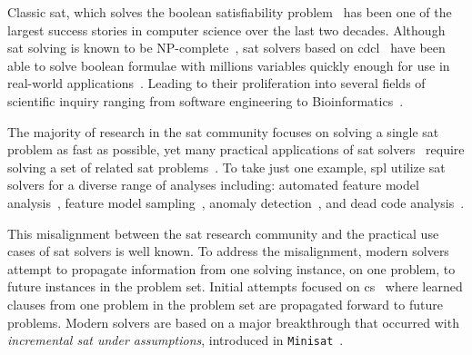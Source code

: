 \label{section:motivation}
%
%
Classic \ac{sat}, which solves the boolean satisfiability problem~\cite{BBH+09}
has been one of the largest success stories in computer science over the last
two decades. Although \ac{sat} solving is known to be
NP-complete~\cite{10.1145/800157.805047}, \ac{sat} solvers based on
\ac{cdcl}~\cite{Marques-Silva:1999:GSA:304491.304506,Silva:1997:GNS:244522.244560,10.5555/1867406.1867438}
have been able to solve boolean formulae with millions variables quickly enough
for use in real-world applications~\cite{10.5555/1557461}. Leading to their
proliferation into several fields of scientific inquiry ranging from software
engineering to
Bioinformatics~\cite{10.1007/11814948_16,10.1007/978-3-642-31612-8_12}.

The majority of research in the \ac{sat} community focuses on solving a single
\ac{sat} problem as fast as possible, yet many practical applications of
\ac{sat}
solvers~\cite{silva1997robust,10.1007/3-540-44798-9_4,10.1145/378239.379019,10.1145/1698759.1698762,Een_asingle-instance,een2003temporal,10.5555/1998496.1998520}
require solving a set of related \ac{sat}
problems~\cite{10.1007/3-540-44798-9_4, silva1997robust, een2003temporal}. To
take just one example, \acl{spl} utilize \ac{sat} solvers for a diverse range of
analyses including: automated feature model
analysis~\cite{useBTRC05,GBT+19,TAK+:CSUR14}, feature model
sampling~\cite{MKR+:ICSE16,VAT+:SPLC18}, anomaly
detection~\cite{AKTS:FOSD16,KAT:TR16,MNS+:SPLC17}, and dead code
analysis~\cite{TLSS:EuroSys11}.

This misalignment between the \ac{sat} research community and the practical use
cases of \ac{sat} solvers is well known. To address the misalignment, modern
solvers attempt to propagate information from one solving instance, on one
problem, to future instances in the problem set. Initial attempts focused on
\ac{cs}~\cite{10.1007/3-540-44798-9_4,10.1145/378239.379019} where learned
clauses from one problem in the problem set are propagated forward to future
problems. Modern solvers are based on a major breakthrough that occurred with
\emph{incremental \ac{sat} under assumptions}, introduced in
\texttt{Minisat}~\cite{10.1007/978-3-540-24605-3_37}.

